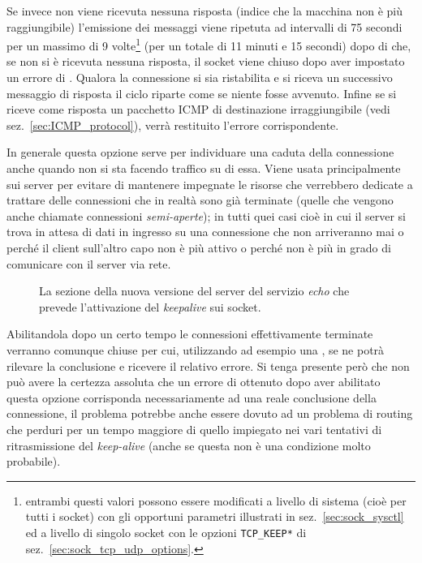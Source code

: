 Se invece non viene ricevuta nessuna risposta (indice che la macchina non è
più raggiungibile) l'emissione dei messaggi viene ripetuta ad intervalli di 75
secondi per un massimo di 9 volte\footnote{entrambi questi valori possono
  essere modificati a livello di sistema (cioè per tutti i socket) con gli
  opportuni parametri illustrati in sez.~\ref{sec:sock_sysctl} ed a livello di
  singolo socket con le opzioni \texttt{TCP\_KEEP*} di
  sez.~\ref{sec:sock_tcp_udp_options}.}  (per un totale di 11 minuti e 15
secondi) dopo di che, se non si è ricevuta nessuna risposta, il socket viene
chiuso dopo aver impostato un errore di . Qualora la
connessione si sia ristabilita e si riceva un successivo messaggio di risposta
il ciclo riparte come se niente fosse avvenuto.  Infine se si riceve come
risposta un pacchetto ICMP di destinazione irraggiungibile (vedi
sez.~\ref{sec:ICMP_protocol}), verrà restituito l'errore corrispondente.

In generale questa opzione serve per individuare una caduta della connessione
anche quando non si sta facendo traffico su di essa.  Viene usata
principalmente sui server per evitare di mantenere impegnate le risorse che
verrebbero dedicate a trattare delle connessioni che in realtà sono già
terminate (quelle che vengono anche chiamate connessioni
\textsl{semi-aperte}); in tutti quei casi cioè in cui il server si trova in
attesa di dati in ingresso su una connessione che non arriveranno mai o perché
il client sull'altro capo non è più attivo o perché non è più in grado di
comunicare con il server via rete.

\begin{figure}[!htbp]
  \footnotesize \centering
  \begin{minipage}[c]{\codesamplewidth}
  \end{minipage}
  \normalsize
  \caption{La sezione della nuova versione del server del servizio
    \textit{echo} che prevede l'attivazione del \textit{keepalive} sui
    socket.}
  \label{fig:echod_keepalive_code}
\end{figure}

Abilitandola dopo un certo tempo le connessioni effettivamente terminate
verranno comunque chiuse per cui, utilizzando ad esempio una , se
ne potrà rilevare la conclusione e ricevere il relativo errore. Si tenga
presente però che non può avere la certezza assoluta che un errore di
 ottenuto dopo aver abilitato questa opzione corrisponda
necessariamente ad una reale conclusione della connessione, il problema
potrebbe anche essere dovuto ad un problema di routing che perduri per un
tempo maggiore di quello impiegato nei vari tentativi di ritrasmissione del
\textit{keep-alive} (anche se questa non è una condizione molto probabile).

